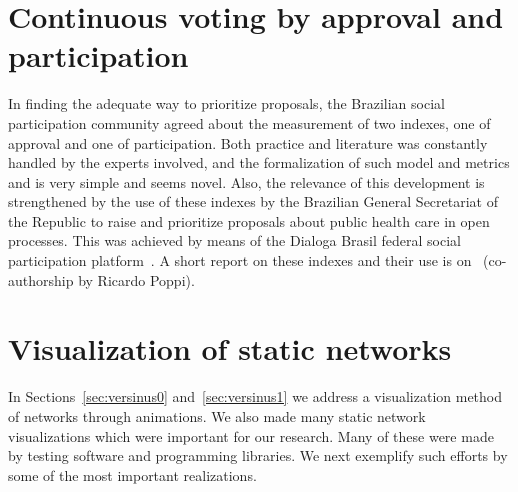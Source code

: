 \begin{apendicesenv}
\section{Continuous voting by approval and participation}\label{ap:vot}
In finding the adequate way to prioritize proposals, the Brazilian social participation community agreed about the measurement of two indexes,
one of approval and one of participation. Both practice and literature
was constantly handled by the experts involved, and the formalization
of such model and metrics and is very simple and seems novel.
Also, the relevance of this development is strengthened by the use of these indexes by the
Brazilian General Secretariat of the Republic to raise and prioritize
proposals about public health care in open processes.
This was achieved by means of the Dialoga Brasil federal social participation platform~\cite{dialoga}.
A short report on these indexes and their use is on~\cite{dialogaAlg}
	(co-authorship by Ricardo Poppi).

	\section{Visualization of static networks}
	In Sections~\ref{sec:versinus0} and~\ref{sec:versinus1} we address a visualization method of networks through animations.
	We also made many static network visualizations which were important for our research.
	Many of these were made by testing software and programming libraries.
	We next exemplify such efforts by some of the most important realizations.


\end{apendicesenv}
